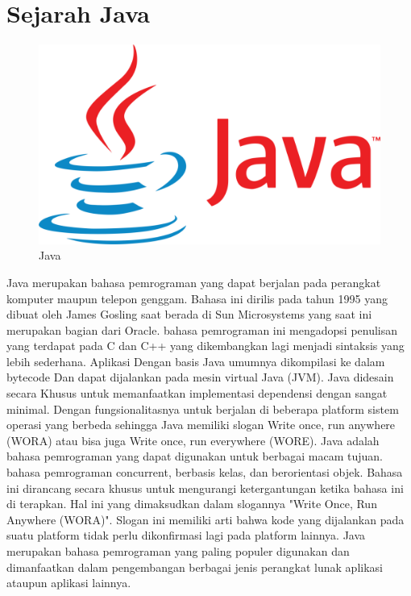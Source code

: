 \section{Sejarah Java}
\begin{figure}[!htbp]
    \centering
    \includegraphics[scale=0.2]{pictures/104-1040733_kotlin-java-programming-language-logo-clipart-1024x598.png}
    \caption{Java}
    \label{}
\end{figure}
Java merupakan bahasa pemrograman yang dapat berjalan pada perangkat komputer maupun telepon genggam.  Bahasa ini dirilis pada tahun 1995 yang  dibuat oleh James Gosling  saat berada di Sun Microsystems  yang  saat ini merupakan bagian dari Oracle. bahasa pemrograman ini mengadopsi penulisan yang terdapat pada C dan C++ yang dikembangkan lagi menjadi sintaksis yang lebih sederhana.  Aplikasi  Dengan basis Java umumnya dikompilasi ke dalam bytecode Dan dapat dijalankan pada mesin virtual Java (JVM). Java  didesain  secara Khusus untuk memanfaatkan implementasi dependensi dengan sangat minimal. Dengan fungsionalitasnya  untuk  berjalan di beberapa platform  sistem operasi yang berbeda sehingga Java memiliki slogan Write once, run anywhere (WORA) atau bisa juga Write once, run everywhere (WORE). Java adalah bahasa pemrograman yang dapat digunakan untuk berbagai macam tujuan.  bahasa pemrograman concurrent, berbasis kelas, dan berorientasi objek. Bahasa ini dirancang secara khusus  untuk mengurangi ketergantungan ketika bahasa ini di terapkan. Hal ini yang dimaksudkan dalam slogannya "Write Once, Run Anywhere (WORA)". Slogan ini memiliki arti bahwa kode yang dijalankan pada suatu platform tidak perlu dikonfirmasi lagi pada platform lainnya. Java merupakan bahasa pemrograman yang paling populer digunakan dan dimanfaatkan dalam pengembangan berbagai jenis perangkat lunak aplikasi ataupun aplikasi lainnya.

